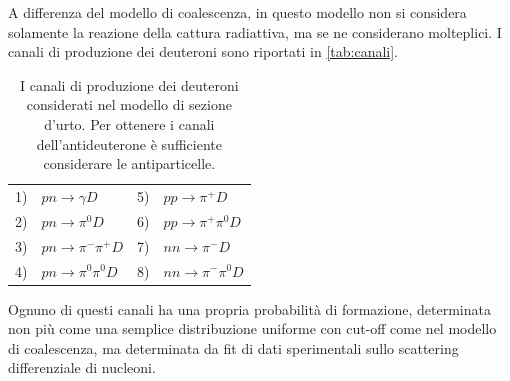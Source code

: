 A differenza del modello di coalescenza, in questo modello non si considera solamente la reazione della cattura radiattiva, ma se ne considerano molteplici.
I canali di produzione dei deuteroni sono riportati in \autoref{tab:canali}.

\begin{table}[H]
    \centering
    \begin{tabular}{clcl}
    \hline \hline
    1) & $pn \to \gamma D$ & 5) & $pp \to \pi^+ D$\\
    2) & $pn \to \pi^0 D$ & 6) & $pp \to \pi^+\pi^0 D$\\
    3) & $pn \to \pi^-\pi^+ D$ & 7) & $nn \to \pi^- D$\\
    4) & $pn \to \pi^0\pi^0 D$ & 8) & $nn \to \pi^-\pi^0 D$\\
    \hline\hline
    \end{tabular}
    \caption{I canali di produzione dei deuteroni considerati nel modello di sezione d'urto. Per ottenere i canali dell'antideuterone è sufficiente considerare le antiparticelle.}
    \label{tab:canali}
\end{table}
Ognuno di questi canali ha una propria probabilità di formazione, determinata non più come una semplice distribuzione uniforme con cut-off come nel modello di coalescenza, ma determinata da fit di dati sperimentali sullo scattering differenziale di nucleoni.

